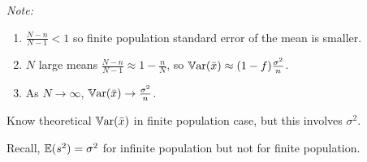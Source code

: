\documentclass[10pt, a4paper]{article}
\begin{document}
\textit{Note:}
\begin{enumerate}[label = (\roman*)]
    \item $\frac{N - n}{N - 1} < 1$ so finite population standard error of the mean is smaller.

    \item $N$ large means $\frac{N - n}{N - 1} \approx 1 - \frac{n}{N}$,
    so $\mathbb{V}\mathrm{ar}(\bar{x}) \approx (1 - f)\frac{\sigma ^ 2}{n}$.

    \item As $N \to \infty$,
    $\mathbb{V}\mathrm{ar}(\bar{x}) \to \frac{\sigma ^ 2}{n}$.
\end{enumerate}

Know theoretical $\mathbb{V}\mathrm{ar}(\bar{x})$ in finite population case,
but this involves $\sigma ^ 2$.

Recall,
$\mathbb{E}(s ^ 2) = \sigma ^ 2$ for infinite population but not for finite population.
\end{document}
